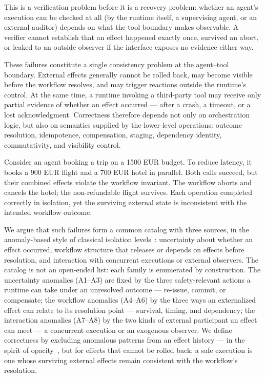 \documentclass{article}
\begin{document}
This is a verification problem before it is a recovery problem: whether an
agent's execution can be checked at all (by the runtime itself, a supervising agent, or an external auditor) depends on what the tool
boundary makes observable. A verifier cannot establish that an effect
happened exactly once, survived an abort, or leaked to an outside observer
if the interface exposes no evidence either way.

These failures constitute a single consistency problem at the agent--tool
boundary. External effects
generally cannot be rolled back, may become visible before the workflow
resolves, and may trigger reactions outside the runtime's control. At the
same time, a runtime invoking a third-party tool may receive only partial
evidence of whether an effect occurred --- after a crash, a timeout, or a
lost acknowledgment. Correctness therefore depends not only on
orchestration logic, but also on semantics supplied by the lower-level
operations: outcome resolution, idempotence, compensation, staging,
dependency identity, commutativity, and visibility control.

Consider an agent booking a trip on a 1500 EUR budget. To reduce latency,
it books a 900 EUR flight and a 700 EUR hotel in parallel. Both calls
succeed, but their combined effects violate the workflow invariant. The
workflow aborts and cancels the hotel; the non-refundable flight survives.
Each operation completed correctly in isolation, yet the surviving external
state is inconsistent with the intended workflow outcome.

We argue that such failures form a common catalog with three sources, in
the anomaly-based style of classical isolation
levels~\cite{berenson1995critique,adya1999}: uncertainty about whether an
effect occurred, workflow structure that releases or depends on effects
before resolution, and interaction with concurrent executions or external
observers. The catalog is not an open-ended list: each family is enumerated
by construction. The uncertainty anomalies (A1--A3) are fixed by the three
safety-relevant actions a runtime can take under an unresolved outcome ---
re-issue, commit, or compensate; the workflow anomalies (A4--A6) by the
three ways an externalized effect can relate to its resolution point ---
survival, timing, and dependency; the interaction anomalies (A7--A8) by the
two kinds of external participant an effect can meet --- a concurrent
execution or an exogenous observer. We define correctness by excluding
anomalous patterns from an
effect history --- in the spirit of opacity~\cite{guerraoui2008opacity},
but for effects that cannot be rolled back: a safe execution is one whose
surviving external effects remain consistent with the workflow's
resolution.
\end{document}
